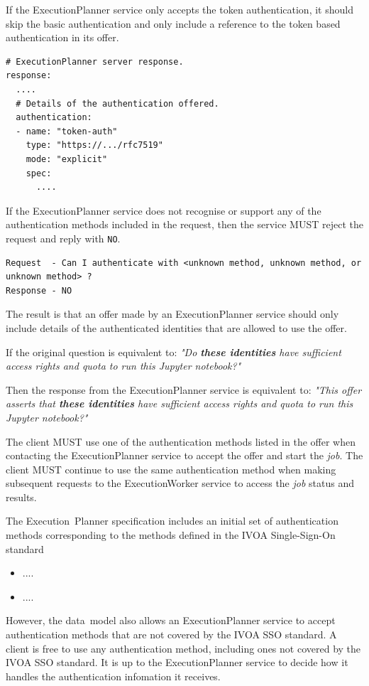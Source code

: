\documentclass[11pt,a4paper]{ivoa}
\newcommand{\datamodel} {data~model}
\newcommand{\ivoa} {IVOA}
\newcommand{\execplanner} {ExecutionPlanner}
\newcommand{\execworker} {ExecutionWorker}
\newcommand{\executionplanner} {Execution~Planner}
\newcommand{\jupyternotebook} {Jupyter notebook}
\newcommand{\codeword}[1] {\texttt{#1}}
\newcommand{\job} {\textit{job}}
\begin{document}
If the \execplanner{} service only accepts the token authentication, it should
skip the basic authentication and only include a reference to the token
based authentication in its offer.

\begin{lstlisting}[]
# ExecutionPlanner server response.
response:
  ....
  # Details of the authentication offered.
  authentication:
  - name: "token-auth"
    type: "https://.../rfc7519"
    mode: "explicit"
    spec:
      ....
\end{lstlisting}

If the \execplanner{} service does not recognise or support any of the authentication methods
included in the request, then the service MUST reject the request and reply with \codeword{NO}.

\begin{lstlisting}[]
Request  - Can I authenticate with <unknown method, unknown method, or unknown method> ?
Response - NO
\end{lstlisting}

The result is that an offer made by an \execplanner{} service should only include details
of the authenticated identities that are allowed to use the offer.

If the original question is equivalent to:
\textit{"Do \textbf{these identities} have sufficient access rights and quota to run this \jupyternotebook{}?"}

Then the response from the \execplanner{} service is equivalent to:
\textit{"This offer asserts that \textbf{these identities} have sufficient access rights and quota to run this \jupyternotebook{}?"}

The client MUST use one of the authentication methods listed in the offer when
contacting the \execplanner{} service to accept the offer and start the \job{}.
The client MUST continue to use the same authentication method when making subsequent
requests to the \execworker{} service to access the \job{} status and results.

The \executionplanner{} specification includes an initial set of authentication methods
corresponding to the methods defined in the
\ivoa{} Single-Sign-On standard\citep{2017ivoa.spec.0524T}

\begin{itemize}
    \item ....
    \item ....
\end{itemize}

However, the \datamodel{} also allows an \execplanner{} service to accept authentication
methods that are not covered by the \ivoa{} SSO standard.
A client is free to use any authentication method, including ones not covered by the
\ivoa{} SSO standard. It is up to the \execplanner{} service to decide how it
handles the authentication infomation it receives.
\end{document}
